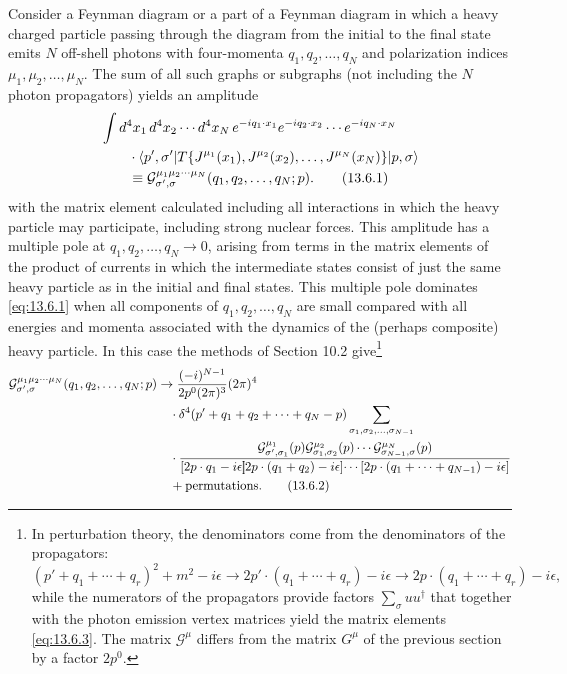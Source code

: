 Consider a Feynman diagram or a part of a Feynman diagram in which
a heavy charged particle passing through the diagram from the initial to
the final state emits $N$ off-shell photons with four-momenta $q_1,q_2,\ldots,q_N$
and polarization indices $\mu_1,\mu_2,\ldots,\mu_N$. The sum of all such graphs or
subgraphs (not including the $N$ photon propagators) yields an amplitude
\begin{align}
&\int d^4x_1\,d^4x_2\cdots d^4x_N\,
e^{-iq_1\cdot x_1}e^{-iq_2\cdot x_2}\cdots e^{-iq_N\cdot x_N}
\notag\\
&\qquad\cdot\langle p',\sigma'\rvert T\{J^{\mu_1}(x_1),J^{\mu_2}(x_2),
\ldots,J^{\mu_N}(x_N)\}\lvert p,\sigma\rangle
\notag\\
&\qquad\equiv\mathcal G^{\mu_1\mu_2\cdots\mu_N}_{\sigma',\sigma}
(q_1,q_2,\ldots,q_N;p).
\tag{13.6.1}\label{eq:13.6.1}
\end{align}
with the matrix element calculated including all interactions in which
the heavy particle may participate, including strong nuclear forces. This
amplitude has a multiple pole at $q_1,q_2,\ldots,q_N\to0$, arising from terms in
the matrix elements of the product of currents in which the intermediate
states consist of just the same heavy particle as in the initial and final states.
This multiple pole dominates \eqref{eq:13.6.1} when all components of $q_1,q_2,\ldots,q_N$
are small compared with all energies and momenta associated with the
dynamics of the (perhaps composite) heavy particle. In this case the
methods of Section 10.2 give\footnote{In perturbation theory, the denominators come from the denominators of the propagators:
\[
(p'+q_1+\cdots+q_r)^2+m^2-i\epsilon
\to2p'\cdot(q_1+\cdots+q_r)-i\epsilon
\to2p\cdot(q_1+\cdots+q_r)-i\epsilon,
\]
while the numerators of the propagators provide factors $\sum_\sigma uu^\dagger$
that together with the photon emission vertex matrices yield the matrix
elements \eqref{eq:13.6.3}. The matrix $\mathcal G^\mu$ differs from the matrix
$G^\mu$ of the previous section by a factor $2p^0$.}
\begin{align}
\mathcal G^{\mu_1\mu_2\cdots\mu_N}_{\sigma',\sigma}
(q_1,q_2,\ldots,q_N;p)
&\to\frac{(-i)^{N-1}}{2p^0(2\pi)^3}(2\pi)^4
\notag\\
&\quad\cdot\delta^4(p'+q_1+q_2+\cdots+q_N-p)
\sum_{\sigma_1,\sigma_2,\ldots,\sigma_{N-1}}
\notag\\
&\quad\cdot
\frac{\mathcal G^{\mu_1}_{\sigma',\sigma_1}(p)
\mathcal G^{\mu_2}_{\sigma_1,\sigma_2}(p)\cdots
\mathcal G^{\mu_N}_{\sigma_{N-1},\sigma}(p)}
{[2p\cdot q_1-i\epsilon]\!\!
[2p\cdot(q_1+q_2)-i\epsilon]\!\cdots
[2p\cdot(q_1+\cdots+q_{N-1})-i\epsilon]}
\notag\\
&\quad+\text{permutations}.
\tag{13.6.2}\label{eq:13.6.2}
\end{align}

